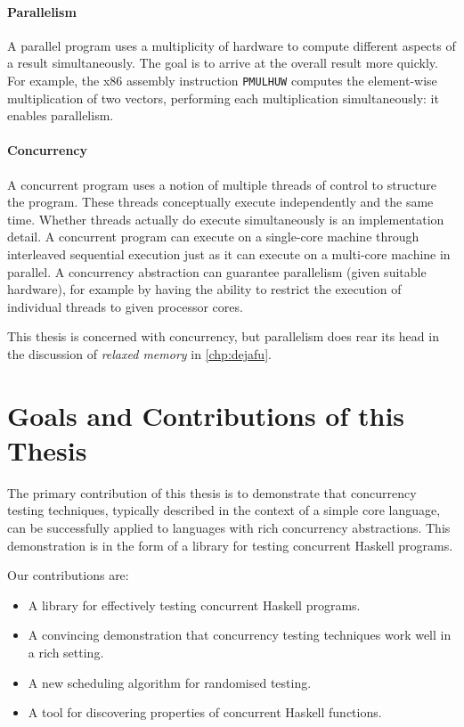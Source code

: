 \paragraph{Parallelism}
A parallel program uses a multiplicity of hardware to compute
different aspects of a result simultaneously.  The goal is to arrive
at the overall result more quickly.  For example, the x86 assembly
instruction \verb#PMULHUW# computes the element-wise multiplication of
two vectors, performing each multiplication simultaneously: it enables
parallelism.

\paragraph{Concurrency}
A concurrent program uses a notion of multiple threads of control to
structure the program.  These threads conceptually execute
independently and the same time.  Whether threads actually do execute
simultaneously is an implementation detail.  A concurrent program can
execute on a single-core machine through interleaved sequential
execution just as it can execute on a multi-core machine in parallel.
A concurrency abstraction can guarantee parallelism (given suitable
hardware), for example by having the ability to restrict the execution
of individual threads to given processor cores.

This thesis is concerned with concurrency, but parallelism does rear
its head in the discussion of \emph{relaxed memory} in
\cref{chp:dejafu}.

\section{Goals and Contributions of this Thesis}
\label{sec:intro-contributions}

The primary contribution of this thesis is to demonstrate that
concurrency testing techniques, typically described in the context of
a simple core language, can be successfully applied to languages with
rich concurrency abstractions.  This demonstration is in the form of a
library for testing concurrent Haskell programs.

Our contributions are:

\begin{itemize}
\item A library for effectively testing concurrent Haskell programs.
\item A convincing demonstration that concurrency testing techniques
  work well in a rich setting.
\item A new scheduling algorithm for randomised testing.
\item A tool for discovering properties of concurrent Haskell
  functions.
\end{itemize}

